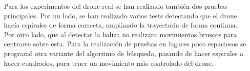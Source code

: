 
\hspace{1cm} Para los experimentos del drone real se han realizado tambi\'en dos pruebas principales. Por un lado, se han realizado varios tests detectando que el drone hac\'ia espirales de forma correcta, ampliando la trayectoria de forma continua. Por otro lado, que al detectar la baliza no realizara movimientos bruscos para centrarse sobre esta. Para la realizaci\'on de pruebas en lugares poco espaciosos se program\'o otra variante del algoritmo de b\'usqueda, pasando de hacer espirales a hacer cuadrados, para tener un movimiento m\'as controlado del drone. 

